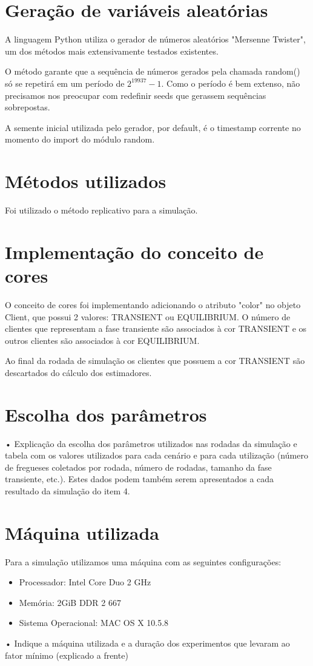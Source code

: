 \section{Geração de variáveis aleatórias}
A linguagem Python utiliza o gerador de números aleatórios "Mersenne Twister", um dos métodos mais extensivamente testados existentes. 

O método garante que a sequência de números gerados pela chamada random() só se repetirá em um período de $2^{19937}-1$. Como o período é bem extenso, não precisamos nos preocupar com redefinir seeds que gerassem sequências sobrepostas.

A semente inicial utilizada pelo gerador, por default, é o timestamp corrente no momento do import do módulo random.

\section{Métodos utilizados}
Foi utilizado o método replicativo para a simulação.

\section{Implementação do conceito de cores}
O conceito de cores foi implementando adicionando o atributo "color" no objeto Client, que possui 2 valores: TRANSIENT ou EQUILIBRIUM.  O número de clientes que representam a fase transiente são associados à cor TRANSIENT e os outros clientes são associados à cor EQUILIBRIUM.

Ao final da rodada de simulação os clientes que possuem a cor TRANSIENT são descartados do cálculo dos estimadores.

\section{Escolha dos parâmetros}
• Explicação da escolha dos parâmetros utilizados nas rodadas da simulação e tabela com
os valores utilizados para cada cenário e para cada utilização (número de fregueses
coletados por rodada, número de rodadas, tamanho da fase transiente, etc.). Estes dados
podem também serem apresentados a cada resultado da simulação do item 4.

\section{Máquina utilizada}
Para a simulação utilizamos uma máquina com as seguintes configurações:
\begin{itemize}
  \item Processador: Intel Core Duo 2 GHz 
  \item Memória: 2GiB DDR 2 667
  \item Sistema Operacional: MAC OS X 10.5.8
\end{itemize}

• Indique a máquina utilizada e a duração dos experimentos que levaram ao fator mínimo
(explicado a frente)

